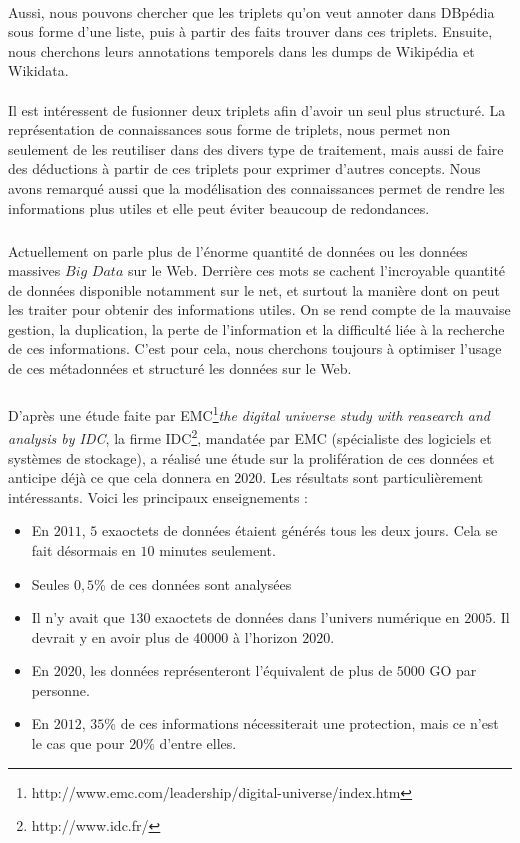 \paragraph{}
Aussi, nous pouvons chercher que les triplets qu'on veut annoter dans DBpédia sous forme d'une liste, puis à partir des faits trouver dans ces triplets. Ensuite, nous cherchons leurs annotations temporels dans les dumps de Wikipédia et Wikidata.
\paragraph{}
Il est intéressent de fusionner deux triplets afin d'avoir un seul plus structuré. La représentation de connaissances sous forme de triplets, nous permet non seulement de les reutiliser dans des divers type de traitement, mais aussi de faire des déductions à partir de ces triplets pour exprimer d'autres concepts. Nous avons remarqué aussi que la modélisation des connaissances permet de rendre les informations plus utiles et elle peut éviter beaucoup de redondances. 
\subparagraph{}
Actuellement on parle plus de l'énorme quantité de données ou les données massives $Big$ $Data$ sur le Web. Derrière ces mots se cachent l’incroyable quantité de données disponible notamment sur le net, et surtout la manière dont on peut les traiter pour obtenir des informations utiles. On se rend compte de la mauvaise gestion, la duplication, la perte de l'information et la difficulté liée à la recherche de ces informations. C'est pour cela, nous cherchons toujours à optimiser l'usage de ces métadonnées et structuré les données sur le Web.
\subparagraph{}
D'après une étude faite par EMC\footnote{http://www.emc.com/leadership/digital-universe/index.htm}{\it the digital universe study with  reasearch and analysis by IDC}, la firme IDC\footnote{http://www.idc.fr/}, mandatée par EMC (spécialiste des logiciels et systèmes de stockage), a réalisé une étude sur la prolifération de ces données et anticipe déjà ce que cela donnera en $2020$. Les résultats sont particulièrement intéressants. Voici les principaux enseignements :
\begin{itemize}
\item En $2011$, $5$ exaoctets de données étaient générés tous les deux jours. Cela se fait désormais en $10$ minutes seulement.
\item Seules $0,5$\% de ces données sont analysées
\item Il n’y avait que $130$ exaoctets de données dans l’univers numérique en $2005$. Il devrait y en avoir plus de $40 000$ à l’horizon $2020$.
\item En $2020$, les données représenteront l’équivalent de plus de $5 000$ GO par personne.
\item En $2012$, $35$\% de ces informations nécessiterait une protection, mais ce n’est le cas que pour $20$\% d’entre elles.
\end{itemize}
